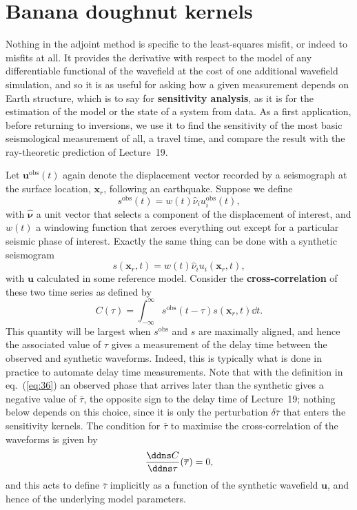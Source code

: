 \section*{Banana doughnut kernels}
Nothing in the adjoint method is specific to the least-squares misfit, or indeed to misfits at all. It provides the 
derivative with respect to the model of any differentiable functional of the wavefield at the cost of one additional 
wavefield simulation, and so it is as useful for asking how a given measurement depends on Earth structure, which is 
to say for \textbf{sensitivity analysis}, as it is for the estimation of the model or the state of a system from data. 
As a first application, before returning to inversions, we use it to find the sensitivity of the most basic seismological 
measurement of all, a travel time, and compare the result with the ray-theoretic prediction of Lecture~19.

Let $\mathbf{u}^{\mathrm{obs}}(t)$ again denote the displacement vector recorded by a seismograph at the surface location, 
$\mathbf{x}_{r}$, following an earthquake. Suppose we define
\begin{equation}
s^{\mathrm{obs}}(t)=w(t)\hat{\nu}_{i}u_{i}^{\mathrm{obs}}(t),
\label{eq:34}
\end{equation}
with $\hat{\bm{\nu}}$ a unit vector that selects a component of the displacement of interest, 
and $w(t)$ a windowing function that zeroes everything out except for a particular seismic phase of interest. Exactly 
the same thing can be done with a synthetic seismogram
\begin{equation}
s(\mathbf{x}_{r},t)=w(t)\hat{\nu}_{i}u_{i}(\mathbf{x}_{r},t),
\label{eq:35}
\end{equation}
with $\mathbf{u}$ calculated in some reference model. Consider 
the \textbf{cross-correlation} of these two time series as defined by
\begin{equation}
C(\tau)=\int_{-\infty}^{\infty}s^{\mathrm{obs}}(t-\tau)s(\mathbf{x}_{r},t)\dd t.
\label{eq:36}
\end{equation}
This quantity will be largest when $s^{\mathrm{obs}}$ and $s$ are maximally aligned, and hence the associated value 
of $\tau$ gives a measurement of the delay time between the observed and synthetic waveforms. Indeed, this 
is typically what is done in practice to automate delay time measurements. Note that with the definition in eq.~(\ref{eq:36})
an observed phase that arrives later than the synthetic gives a negative value of $\overline{\tau}$, the opposite sign to the delay
time of Lecture~19; nothing below depends on this choice, since it is only the perturbation $\delta\overline{\tau}$ that enters
the sensitivity kernels. The condition for $\overline{\tau}$
to maximise the cross-correlation of the waveforms is given by
\begin{equation}
\frac{\ddns C}{\ddns\tau}(\overline{\tau})=0,
\label{eq:37}
\end{equation}
and this acts to define $\overline{\tau}$ implicitly as a function of the synthetic wavefield $\mathbf{u}$, and
 hence of the underlying model parameters. 
 
